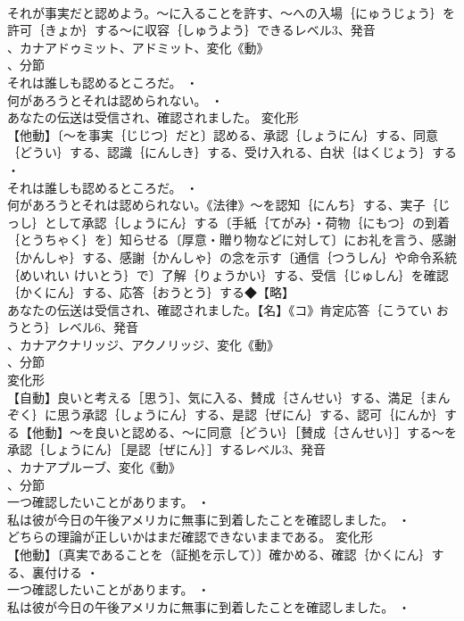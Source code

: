 \documentclass[8pt]{extreport}
\begin{document}
\begin{CJK}{UTF8}{min}
\\	それが事実だと認めよう。～に入ることを許す、～への入場｛にゅうじょう｝を許可｛きょか｝する～に収容｛しゅうよう｝できるレベル3、発音
\\	、カナアドゥミット、アドミット、変化《動》
\\	、分節
\\	それは誰しも認めるところだ。 ・
\\	何があろうとそれは認められない。 ・
\\	あなたの伝送は受信され、確認されました。	変化形 
\\	【他動】〔～を事実｛じじつ｝だと〕認める、承認｛しょうにん｝する、同意｛どうい｝する、認識｛にんしき｝する、受け入れる、白状｛はくじょう｝する ・
\\	それは誰しも認めるところだ。 ・
\\	何があろうとそれは認められない。《法律》～を認知｛にんち｝する、実子｛じっし｝として承認｛しょうにん｝する〔手紙｛てがみ｝・荷物｛にもつ｝の到着｛とうちゃく｝を〕知らせる〔厚意・贈り物などに対して〕にお礼を言う、感謝｛かんしゃ｝する、感謝｛かんしゃ｝の念を示す〔通信｛つうしん｝や命令系統｛めいれい けいとう｝で〕了解｛りょうかい｝する、受信｛じゅしん｝を確認｛かくにん｝する、応答｛おうとう｝する◆【略】
\\	あなたの伝送は受信され、確認されました。【名】《コ》肯定応答｛こうてい おうとう｝レベル6、発音
\\	、カナアクナリッジ、アクノリッジ、変化《動》
\\	、分節
\\	変化形 
\\	【自動】良いと考える［思う］、気に入る、賛成｛さんせい｝する、満足｛まんぞく｝に思う承認｛しょうにん｝する、是認｛ぜにん｝する、認可｛にんか｝する【他動】～を良いと認める、～に同意｛どうい｝［賛成｛さんせい｝］する～を承認｛しょうにん｝［是認｛ぜにん｝］するレベル3、発音
\\	、カナアプルーブ、変化《動》
\\	、分節
\\	一つ確認したいことがあります。 ・
\\	私は彼が今日の午後アメリカに無事に到着したことを確認しました。 ・
\\	どちらの理論が正しいかはまだ確認できないままである。	変化形 
\\	【他動】〔真実であることを（証拠を示して）〕確かめる、確認｛かくにん｝する、裏付ける ・
\\	一つ確認したいことがあります。 ・
\\	私は彼が今日の午後アメリカに無事に到着したことを確認しました。 ・

\end{CJK}
\end{document}
